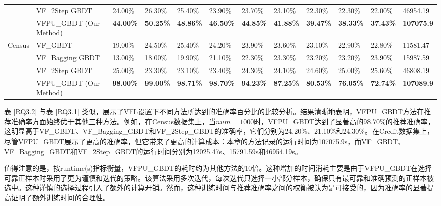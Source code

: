 \begin{table}[h]
{{\begin{tabular}{llllllllllll}
				& VF\_2Step GBDT          & 24.00\%          & 26.30\%          & 25.40\%          & 23.90\%          & 23.70\%          & 23.10\%          & 22.30\%          & 22.30\%          & 22.00\%          & 46954.19           \\
				& VFPU\_GBDT (Our Method) & \textbf{44.00\%} & \textbf{50.25\%} & \textbf{48.86\%} & \textbf{46.50\%} & \textbf{44.85\%} & \textbf{41.88\%} & \textbf{39.47\%} & \textbf{38.33\%} & \textbf{37.43\%} & \textbf{107075.9}  \\ 
				\hline
				\multirow{4}{*}{Census} & VF\_GBDT                & 19.00\%          & 24.50\%          & 25.40\%          & 24.20\%          & 23.90\%          & 23.60\%          & 23.10\%          & 22.90\%          & 22.80\%          & 11581.47           \\
				& VF\_Bagging GBDT        & 13.00\%          & 18.00\%          & 19.90\%          & 21.10\%          & 22.30\%          & 23.30\%          & 23.20\%          & 23.20\%          & 23.90\%          & 15987.59           \\
				& VF\_2Step GBDT          & 25.00\%          & 23.30\%          & 23.10\%          & 23.40\%          & 24.30\%          & 24.10\%          & 24.60\%          & 25.00\%          & 25.60\%          & 46808.19           \\
				& VFPU\_GBDT (Our Method) & \textbf{98.00\%} & \textbf{99.00\%} & \textbf{98.71\%} & \textbf{98.70\%} & \textbf{94.23\%} & \textbf{87.25\%} & \textbf{80.53\%} & \textbf{76.05\%} & \textbf{72.74\%} & \textbf{107089.9}  \\
				\hline
			\end{tabular}
		}
	}
\end{table}
\vspace{-0.1cm}

表 \ref{RQ3.2} 与表 \ref{RQ3.1} 类似，展示了VFL设置下不同方法所达到的准确率百分比的比较分析。结果清晰地表明，VFPU\_GBDT方法在推荐准确率方面始终优于其他三种方法。例如，在Census数据集上，当$num=1000$时，VFPU\_GBDT达到了显著高的98.70\%的推荐准确率，这明显高于VF\_GBDT、VF\_Bagging\_GBDT和VF\_2Step\_GBDT的准确率，它们分别为24.20\%、21.10\%和24.30\%。在Credit数据集上，尽管VFPU\_GBDT展示了更高的准确率，但它带来了更高的计算成本：本章的方法记录的运行时间为107075.9s，而VF\_GBDT、VF\_Bagging\_GBDT和VF\_2Step\_GBDT的运行时间分别为12025.47s、15791.59s和46954.19s。

值得注意的是，按runtime(s)指标衡量，VFPU\_GBDT的耗时约为其他方法的10倍。这种增加的时间消耗主要是由于VFPU\_GBDT在选择可靠正样本时采用了更为谨慎和迭代的策略。该算法采用多次迭代，每次迭代只选择一小部分样本，确保只有最可靠和准确预测的正样本被选中。这种谨慎的选择过程引入了额外的计算开销。然而，这种训练时间与推荐准确率之间的权衡被认为是可接受的，因为准确率的显著提高证明了额外训练时间的合理性。

